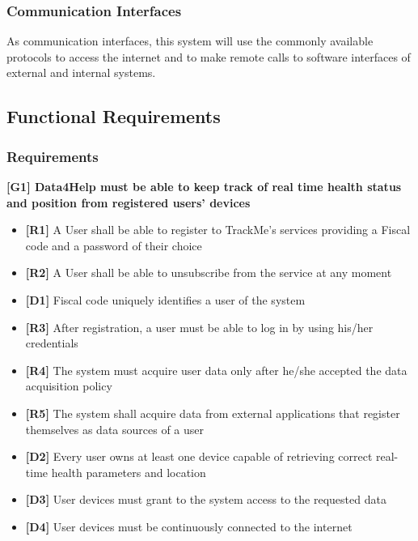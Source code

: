 \subsubsection{Communication Interfaces}
As communication interfaces, this system will use the commonly available protocols to access the internet and to make remote calls to software interfaces of external and internal systems.

\subsection{Functional Requirements}

\subsubsection{Requirements}
\textbf{[G1] Data4Help must be able to keep track of real time health status and position from registered users' devices}
\begin{itemize}
	\item \textbf{[R1]} A User shall be able to register to TrackMe's services providing a Fiscal code and a password of their choice
	\item \textbf{[R2]} A User shall be able to unsubscribe from the service at any moment
	\item \textbf{[D1]} Fiscal code uniquely identifies a user of the system
	\item \textbf{[R3]} After registration, a user must be able to log in by using his/her credentials
	\item \textbf{[R4]} The system must acquire user data only after he/she accepted the data acquisition policy
	\item \textbf{[R5]} The system shall acquire data from external applications that register themselves as data sources of a user
	\item \textbf{[D2]} Every user owns at least one device capable of retrieving correct real-time health parameters and location
	\item \textbf{[D3]} User devices must grant to the system access to the requested data
	\item \textbf{[D4]} User devices must be continuously connected to the internet
\end{itemize}

